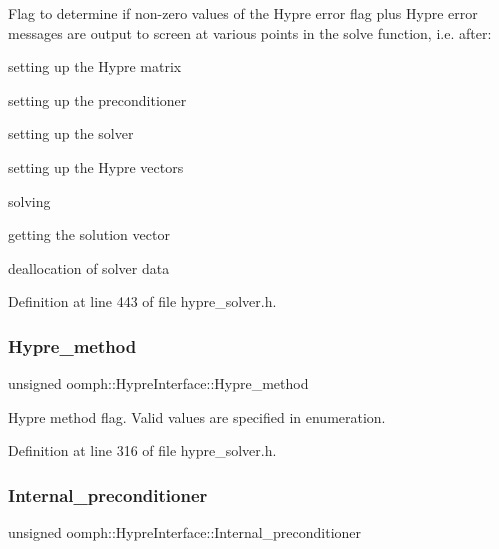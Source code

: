 Flag to determine if non-\/zero values of the Hypre error flag plus Hypre error messages are output to screen at various points in the solve function, i.\+e. after\+: 


\begin{DoxyEnumerate}
\item setting up the Hypre matrix
\item setting up the preconditioner
\item setting up the solver
\item setting up the Hypre vectors
\item solving
\item getting the solution vector
\item deallocation of solver data 
\end{DoxyEnumerate}

Definition at line 443 of file hypre\+\_\+solver.\+h.

\mbox{\label{classoomph_1_1HypreInterface_ae2a79282191b4430ef6631df9fc8c947}} 
\subsubsection{\texorpdfstring{Hypre\+\_\+method}{Hypre\_method}}
{\footnotesize\ttfamily unsigned oomph\+::\+Hypre\+Interface\+::\+Hypre\+\_\+method\hspace{0.3cm}{\ttfamily [protected]}}



Hypre method flag. Valid values are specified in enumeration. 



Definition at line 316 of file hypre\+\_\+solver.\+h.

\mbox{\label{classoomph_1_1HypreInterface_a5694f23f49b16ca978e6bcb629c7ab27}} 
\subsubsection{\texorpdfstring{Internal\+\_\+preconditioner}{Internal\_preconditioner}}
{\footnotesize\ttfamily unsigned oomph\+::\+Hypre\+Interface\+::\+Internal\+\_\+preconditioner\hspace{0.3cm}{\ttfamily [protected]}}



